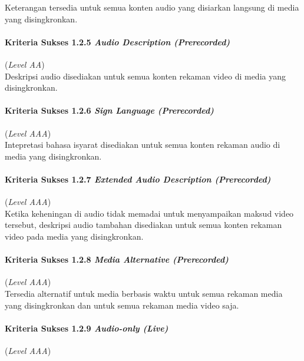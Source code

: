 Keterangan tersedia untuk semua konten audio yang disiarkan langsung di media yang disingkronkan.


\paragraph{Kriteria Sukses 1.2.5 \textit{Audio Description (Prerecorded)}}
\label{subsec:kriteria_1.2.5}
(\textit{Level AA}) \\

Deskripsi audio disediakan untuk semua konten rekaman video di media yang disingkronkan.


\paragraph{Kriteria Sukses 1.2.6 \textit{Sign Language (Prerecorded)}}
\label{subsec:kriteria_1.2.6}
(\textit{Level AAA}) \\

Intepretasi bahasa isyarat disediakan untuk semua konten rekaman audio di media yang disingkronkan.


\paragraph{Kriteria Sukses 1.2.7 \textit{Extended Audio Description (Prerecorded)}}
\label{subsec:kriteria_1.2.7}
(\textit{Level AAA}) \\

Ketika keheningan di audio tidak memadai untuk menyampaikan maksud video tersebut, deskripsi audio tambahan disediakan untuk semua konten rekaman video pada media yang disingkronkan. 


\paragraph{Kriteria Sukses 1.2.8 \textit{Media Alternative (Prerecorded)}}
\label{subsec:kriteria_1.2.8}
(\textit{Level AAA}) \\

Tersedia alternatif untuk media berbasis waktu untuk semua rekaman media yang disingkronkan dan untuk semua rekaman media video saja.

\paragraph{Kriteria Sukses 1.2.9 \textit{Audio-only (Live)}}
\label{subsec:kriteria_1.2.9}
(\textit{Level AAA}) \\

